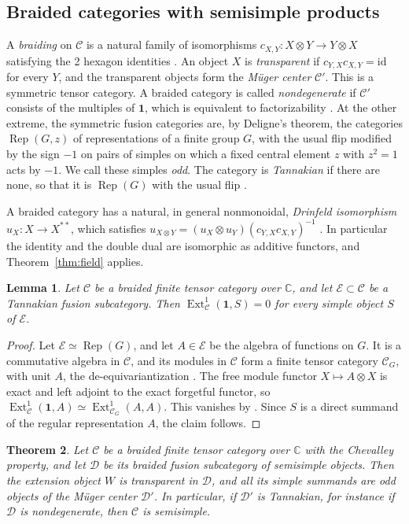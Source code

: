 \documentclass[11pt,reqno]{amsart}
\newtheorem{theorem}{Theorem}[section]
\newtheorem{lemma}[theorem]{Lemma}
\theoremstyle{definition}
\newcommand{\Ext}{\operatorname{Ext}}
\newcommand{\one}{\mathbf 1}
\newcommand{\C}{\mathcal C}
\newcommand{\CC}{\mathbb C}
\newcommand{\Rep}{\operatorname{Rep}}
\begin{document}
\subsection{Braided categories with semisimple products}
A \emph{braiding} on $\C$ is a natural family of isomorphisms $c_{X,Y}:X\otimes Y\to Y\otimes X$ satisfying the 2 hexagon identities \cite[\S8.1]{EGNO}. An object $X$ is \emph{transparent} if $c_{Y,X}c_{X,Y}=\mathrm{id}$ for every $Y$, and the transparent objects form the \emph{M\"uger center} $\C'$. This is a symmetric tensor category. A braided category is called \emph{nondegenerate} if $\C'$ consists of the multiples of $\one$, which is equivalent to factorizability \cite[Theorem~1.1]{Shimizu}. At the other extreme, the symmetric fusion categories are, by Deligne's theorem, the categories $\Rep(G,z)$ of representations of a finite group $G$, with the usual flip modified by the sign $-1$ on pairs of simples on which a fixed central element $z$ with $z^2=1$ acts by $-1$. We call these simples \emph{odd}. The category is \emph{Tannakian} if there are none, so that it is $\Rep(G)$ with the usual flip \cite[\S9.9]{EGNO}.

A braided category has a natural, in general nonmonoidal, \emph{Drinfeld isomorphism} $u_X:X\to X^{**}$, which satisfies $u_{X\otimes Y}=(u_X\otimes u_Y)(c_{Y,X}c_{X,Y})^{-1}$ \cite[\S8.9]{EGNO}. In particular the identity and the double dual are isomorphic as additive functors, and Theorem~\ref{thm:field} applies.

\begin{lemma}\label{lem:tannakian}
Let $\C$ be a braided finite tensor category over $\CC$, and let $\mathcal E\subset\C$ be a Tannakian fusion subcategory. Then $\Ext^1_\C(\one,S)=0$ for every simple object $S$ of $\mathcal E$.
\end{lemma}

\begin{proof}
Let $\mathcal E\simeq\Rep(G)$, and let $A\in\mathcal E$ be the algebra of functions on $G$. It is a commutative algebra in $\C$, and its modules in $\C$ form a finite tensor category $\C_G$, with unit $A$, the de-equivariantization \cite[\S4.3]{NP}. The free module functor $X\mapsto A\otimes X$ is exact and left adjoint to the exact forgetful functor, so $\Ext^1_\C(\one,A)\simeq\Ext^1_{\C_G}(A,A)$. This vanishes by \cite[Theorem~4.4.1]{EGNO}. Since $S$ is a direct summand of the regular representation $A$, the claim follows.
\end{proof}

\begin{theorem}\label{thm:braided-chevalley}
Let $\C$ be a braided finite tensor category over $\CC$ with the Chevalley property, and let $\mathcal D$ be its braided fusion subcategory of semisimple objects. Then the extension object $W$ is transparent in $\mathcal D$, and all its simple summands are odd objects of the M\"uger center $\mathcal D'$. In particular, if $\mathcal D'$ is Tannakian, for instance if $\mathcal D$ is nondegenerate, then $\C$ is semisimple.
\end{theorem}
\end{document}
